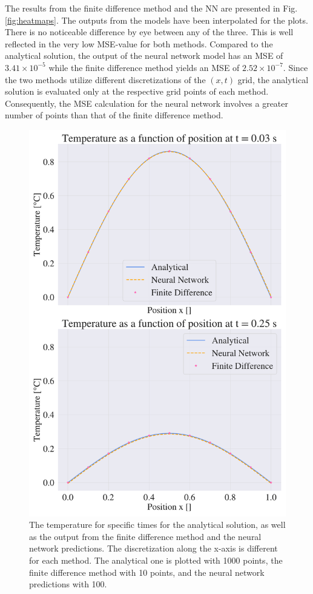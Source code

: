 The results from the finite difference method and the NN are presented in Fig. \ref{fig:heatmaps}.
The outputs from the models have been interpolated for the plots. 
There is no noticeable difference by eye between any of the three.  
This is well reflected in the very low MSE-value for both methods. 
Compared to the analytical solution, the output of the neural network model has an MSE of $ 3.41 \times 10^{-5}$ while the finite difference method yields an MSE of $2.52 \times 10^{-7}$. 
Since the two methods utilize different discretizations of the $(x,t)$ grid, the analytical solution is evaluated only at the respective grid points of each method. 
Consequently, the MSE calculation for the neural network involves a greater number of points than that of the finite difference method.


\begin{figure}[h!]
    \centering
    \includegraphics[width=1.0\linewidth]{project_3/plots/time_slices_comparison.pdf}
    \caption{The temperature for specific times for the analytical solution, as well as the output from the finite difference method and the neural network predictions. The discretization along the x-axis is different for each method. The analytical one is plotted with 1000 points, the finite difference method with 10 points, and the neural network predictions with 100. }
    \label{fig:timeslices}
\end{figure}



